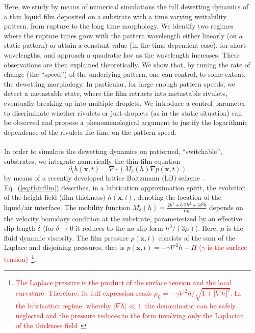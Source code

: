 \documentclass[twocolumn,amsmath,amssymb,showpacs,prl,superscriptaddress]{revtex4-1} %
\newcommand{\REV}[1]{\textcolor{red}{#1}}
\begin{document}
Here, we study by means of numerical simulations the full dewetting dynamics of a thin liquid film deposited on a substrate with a time varying wettability pattern, from rupture to the long time morphology. 
We identify two regimes where the rupture times grow with the pattern wavelength either linearly (on a static pattern) or attain a constant value (in the time dependent case), for short wavelengths, and approach a quadratic law as the wavelength increases. These observations are then explained theoretically.
We show that, by tuning the rate of change (the ``speed'') of the underlying pattern, one can control, to some extent, the dewetting morphology. In particular, for large enough pattern speeds, we detect a metastable state, where the film retracts into metastable rivulets, eventually breaking up into multiple droplets.
We introduce a control parameter to discriminate whether rivulets or just droplets (as in the static situation)
can be observed and propose a phenomenological argument to justify the logarithmic dependence of the rivulets life time on the pattern speed.\\
\\
 In order to simulate the dewetting dynamics on patterned, ``switchable'', substrates, we integrate numerically the thin-film equation~\cite{RevModPhys.69.931,RevModPhys.81.1131} 
\begin{equation}\label{eq:thinfilm}
    \partial_t h(\mathbf{x},t) = \nabla\cdot\left(M_{\delta}(h)\nabla p(\mathbf{x},t)\right)
\end{equation}
by means of a recently developed lattice Boltzmann (LB) scheme~\cite{PhysRevE.100.033313,PhysRevE.104.034801, Zitz2022}.
Eq.~(\ref{eq:thinfilm}) describes, in a lubrication approximation spirit, the evolution of the height field (film thickness) $h(\mathbf{x},t)$, denoting the location of the liquid/air interface. The mobility function 
$M_{\delta}(h) = \frac{2h^3 + 6\,\delta\, h^2 + 3\delta^2h}{6\mu}$
depends on the velocity boundary condition at the substrate, parameterized by an effective slip length $\delta$
(for $\delta \rightarrow 0$ it reduces to the no-slip form $h^3/(3\mu)$). Here, $\mu$ is the fluid dynamic viscosity.
The film pressure $p(\mathbf{x},t)$ consists of the sum of the Laplace and disjoining pressures, that is $p(\mathbf{x},t) = -\gamma \nabla^2 h - \Pi$ \REV{($\gamma$ is the surface tension)}~\footnote{\REV{The Laplace pressure is the product of the surface tension 
and the local curvature. Therefore, its full expression reads $p_L = -\gamma \nabla^2 h/\sqrt{1+|\nabla h|^2}$. 
In the lubrication regime, whereby $|\nabla h| \ll 1$, the denominator can be safely neglected 
and the pressure reduces to the form involving only the Laplacian of the thickness 
field}~\cite{Benet2014,juanes2018}}.
\end{document}
